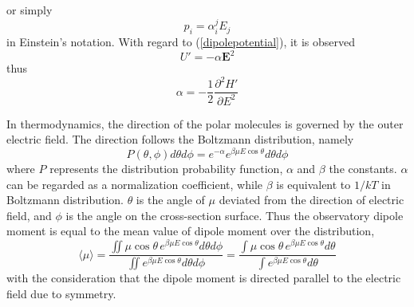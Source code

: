 \documentclass[%
 reprint,
 amsmath,amssymb,
 aps,
10.5pt,
]{revtex4-1}
\begin{document}
  or simply
 \begin{equation}
 	p_i = \alpha^j_i E_j
 \end{equation}
 in Einstein's notation. With regard to (\ref{dipolepotential}), it is observed
 \begin{equation}
 	U' = - \alpha \mathbf{E}^2
 \end{equation}
 thus
 \begin{equation}
 	\alpha = - \frac{1}{2}\frac{\partial^2 H'}{\partial E^2}
 \end{equation}

In thermodynamics, the direction of the polar molecules is governed by the outer electric field. The direction follows the Boltzmann distribution, namely
\begin{equation}
	P(\theta,\phi) d\theta d\phi = e^{-\alpha} e^{\beta \mu E \cos{\theta}} d\theta d\phi
\end{equation}
where $P$ represents the distribution probability function, $\alpha$ and $\beta$ the constants. $\alpha$ can be regarded as a normalization coefficient, while $\beta$ is equivalent to $1/kT$ in Boltzmann distribution. $\theta$ is the angle of $\mu$ deviated from the direction of electric field, and $\phi$ is the angle on the cross-section surface. Thus the observatory dipole moment is equal to the mean value of dipole moment over the distribution, 
\begin{equation}
   \langle  \mu \rangle =
   \frac{\iint \mu \cos{\theta} \, e^{\beta \mu E \cos{\theta}} d\theta d\phi}{\iint e^{\beta \mu E \cos{\theta}} d\theta d\phi} = \frac{\int \mu \cos{\theta} \, e^{\beta \mu E \cos{\theta}} d\theta}{\int e^{\beta \mu E \cos{\theta}} d\theta}
 \end{equation} 
 with the consideration that the dipole moment is directed parallel to the electric field due to symmetry. 
\end{document}
